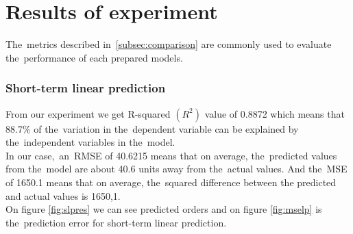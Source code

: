 \section{Results of experiment}\label{subsec:experimentResults}
    The~metrics described in~\ref{subsec:comparison} are commonly used to evaluate
     the~performance of each prepared models.
    \subsubsection{Short-term linear prediction} \label{subsec:res_slp}
    From our experiment we get R-squared $(R^2)$ value of 0.8872 which means that
    88.7\% of the~variation in the~dependent variable can be explained
    by the~independent variables in the~model.\\
    In our case,~an~RMSE of 40.6215 means that on average, the~predicted values
    from the~model are about 40.6 units away from the~actual values.
    And the~MSE of 1650.1 means that on average, the~squared difference between the
    predicted and actual values is 1650,1.\\
    On figure \ref{fig:slpres} we can see predicted orders and on figure \ref{fig:mselp}
    is the~prediction error for short-term linear prediction.
